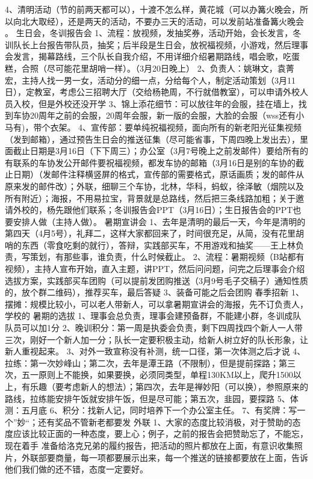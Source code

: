 \documentclass{ctexbook}
\begin{document}
4、清明活动（节的前两天都可以），十渡不怎么样，黄花城（可以办篝火晚会，所以向北大取经），还是两天的活动，不要办三天的活动，可以发前站准备篝火晚会 。
生日会，冬训报告会
1、流程：放视频，发抽奖券，活动开始，会长发言，冬训队长上台报告带队员，抽奖；后半段是生日会，放祝福视频，小游戏，然后理事会发言，揭幕路线，三个队长自我介绍，不用详细介绍暑期路线，唱会歌，吃蛋糕，合照（尽可能花里胡哨一样）。（3月20日晚上）
2、负责人：姚琳文，袁菁宏，主持人找一男一女，活动分的细一点，分给每个人，制定活动策划（3月11日），定教室，考虑公三招聘大厅（交给杨艳周，不行就借教室），可以申请外校人员入校，但是外校还没开学
3、锦上添花细节：可以放往年的会服，挂在墙上，找到车协20周年之前的会服，20周年会服，新一版的会服，大脸的会服（wss还有小马有)，带个衣架。
4、宣传部：要单纯祝福视频，面向所有的新老阳光征集视频（发到邮箱），通过预告生日会的推送征集（尽可能省事，下周四晚上发出去），里面截止日期是3月16日（下下周三）；办公室（3月7号晚上之前发邮件）要给所有的有联系的车协发公开邮件要祝福视频，都发车协的邮箱（3月16日是别的车协的截止日期）（发邮件注释横竖屏的格式，宣传部的需要格式，原话画质；发的邮件从原来发的邮件改）；外联，细聊三个车协，北林，华科，蚂蚁，徐泽敏（烟院以及所有附近）；海报，不用易拉宝，背景就是总路线，然后把三条线路加粗；关于邀请外校的，杨先跟他们联系；冬训报告会PPT（3月16日）；生日报告会的PPT也要安排人做（主持人做）。
暑期宣讲会
1、去年是清明的最后一天，今年是清明的第四天（4月5号），礼拜二，这样大家都回来了，时间很充足，从简，没有花里胡哨的东西（零食吃剩的就行），答辩，实践部买车，不用游戏和抽奖——王上林负责，写策划，有那些事，谁负责，什么时候截止。
2、流程：暑期视频（B站都有视频），主持人宣布开始，直入主题，讲PPT，然后问问题，问完之后理事会介绍选拔方案，实践部买车团购（可以提前发团购推送（3月9号毛子交稿子）通知性质的，放个群二维码），推荐买车，最后答疑
3、装备可能之后会团购
春季招新
1、摆摊：规模比较小，可以老人带新人，可以拿暑期宣讲会的海报，先不订负责人，学校的
暑期的选拔
1、理事会总负责，理事会建预备群，不能建小群，冬训成队队员可以加1分
2、晚训积分：第一周是执委会负责，剩下四周找四个新人一人带三次，刚好一个新人加一分；队长一定要积极主动，给新人树立好的队长形象，让新人重视起来。
3、对外一致宣称没有补测，统一口径，第一次体测之后才说
4、拉练：第一次妙峰山；第二次，去年是潭王路（不限制），但是提前探路；第三次，五一原则上不能换，如果要换，必须同类型，单程130KM以上，爬升1500以上，有乐趣（要考虑新人的想法）；第四次，去年是禅妙阳（可以换），参照原来的路线，拉练能安排午饭就安排午饭，但是尽可能；第五次，韭园，要探路
5、体测：五月底
6、积分：找新人记，同时培养下一个办公室主任。
7、有奖牌：写一个''妙``；还有奖品不管新老都要发
外联
1、大家的态度比较消极，对于赞助的态度应该比较正面的一种态度，要上心；例子，之前的报告会把赞助忘了，不能忘，现在着手 准备给洛克兄弟的履约报告，把活动的照片都放在上面，有意识收集照片，外联部要商量，每一项都要展示出来，每一个推送的链接都要放在上面，告诉他们我们做的还不错，态度一定要好。
\end{document}
